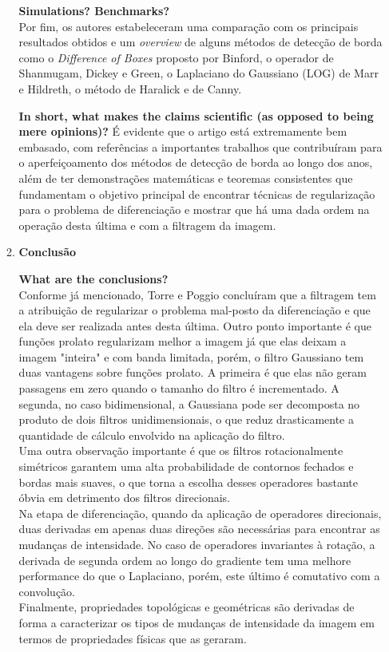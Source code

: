 \begin{enumerate}
\begin{enumerate}[label*=\arabic*.]
    \textbf{Simulations? Benchmarks?}\\
    Por fim, os autores estabeleceram uma comparação com os principais resultados obtidos e um \textit{overview} de alguns métodos de detecção de borda como o \textit{Difference of Boxes} proposto por Binford, o operador de Shanmugam, Dickey e Green, o Laplaciano do Gaussiano (LOG) de Marr e Hildreth, o método de Haralick e de Canny.

    \textbf{In short, what makes the claims scientific (as opposed to being mere opinions)?}
    É evidente que o artigo está extremamente bem embasado, com referências a importantes trabalhos que contribuíram para o aperfeiçoamento dos métodos de detecção de borda ao longo dos anos, além de ter demonstrações matemáticas e teoremas consistentes que fundamentam o objetivo principal de encontrar técnicas de regularização para o problema de diferenciação e mostrar que há uma dada ordem na operação desta última e com a filtragem da imagem.
    \\[6pt]

    \item \textbf{Conclusão}
    
    \textbf{What are the conclusions?}\\
    Conforme já mencionado, Torre e Poggio concluíram que a filtragem tem a atribuição de regularizar o problema mal-posto da diferenciação e que ela deve ser realizada antes desta última. Outro ponto importante é que funções prolato regularizam melhor a imagem já que elas deixam a imagem "inteira" e com banda limitada, porém, o filtro Gaussiano tem duas vantagens sobre funções prolato. A primeira é que elas não geram passagens em zero quando o tamanho do filtro é incrementado. A segunda, no caso bidimensional, a Gaussiana pode ser decomposta no produto de dois filtros unidimensionais, o que reduz drasticamente a quantidade de cálculo envolvido na aplicação do filtro.\\
Uma outra observação importante é que os filtros rotacionalmente simétricos garantem uma alta probabilidade de contornos fechados e bordas mais suaves, o que torna a escolha desses operadores bastante óbvia em detrimento dos filtros direcionais.\\
Na etapa de diferenciação, quando da aplicação de operadores direcionais, duas derivadas em apenas duas direções são necessárias para encontrar as mudanças de intensidade. No caso de operadores invariantes à rotação, a derivada de segunda ordem ao longo do gradiente tem uma melhore performance do que o Laplaciano, porém, este último é comutativo com a convolução.\\
Finalmente, propriedades topológicas e geométricas são derivadas de forma a caracterizar os tipos de mudanças de intensidade da imagem em termos de propriedades físicas que as geraram.


\end{enumerate}
\end{enumerate}
